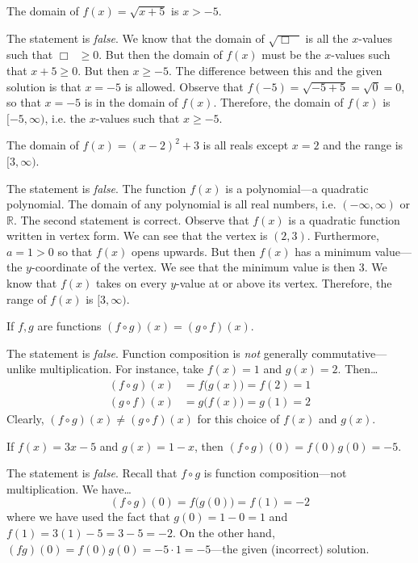 \documentclass[11pt,letterpaper]{article}
\begin{document}
 The domain of $f(x)= \sqrt{x + 5}$ is $x > -5$. \pspace

\sol The statement is \textit{false}. We know that the domain of $\sqrt{\Box{\phantom{x}}\!\!\!}$ is all the $x$-values such that $\Box{\phantom{x}}\!\!\! \geq 0$. But then the domain of $f(x)$ must be the $x$-values such that $x + 5 \geq 0$. But then $x \geq -5$. The difference between this and the given solution is that $x= -5$ is allowed. Observe that $f(-5)= \sqrt{-5 + 5}= \sqrt{0}= 0$, so that $x= -5$ is in the domain of $f(x)$. Therefore, the domain of $f(x)$ is $[-5, \infty)$, i.e. the $x$-values such that $x \geq -5$. \pvspace{{1cm}}



 The domain of $f(x)= (x - 2)^2 + 3$ is all reals except $x= 2$ and the range is $[3, \infty)$. \pspace

\sol The statement is \textit{false}. The function $f(x)$ is a polynomial---a quadratic polynomial. The domain of any polynomial is all real numbers, i.e. $(-\infty, \infty)$ or $\mathbb{R}$. The second statement is correct. Observe that $f(x)$ is a quadratic function written in vertex form. We can see that the vertex is $(2, 3)$. Furthermore, $a= 1 > 0$ so that $f(x)$ opens upwards. But then $f(x)$ has a minimum value---the $y$-coordinate of the vertex. We see that the minimum value is then $3$. We know that $f(x)$ takes on every $y$-value at or above its vertex. Therefore, the range of $f(x)$ is $[3, \infty)$. \pvspace{1cm}



 If $f, g$ are functions $(f \circ g)(x)= (g \circ f)(x)$. \pspace

\sol The statement is \textit{false}. Function composition is \textit{not} generally commutative---unlike multiplication. For instance, take $f(x)= 1$ and $g(x)= 2$. Then\dots
	\[
	\begin{aligned}
	(f \circ g)(x)&= f \big( g(x) \big)= f(2)= 1 \\[0.3cm]
	(g \circ f)(x)&= g \big( f(x) \big)= g(1)= 2
	\end{aligned}
	\]
Clearly, $(f \circ g)(x) \neq (g \circ f)(x)$ for this choice of $f(x)$ and $g(x)$. \pvspace{1.3cm}



 If $f(x)= 3x - 5$ and $g(x) = 1 - x$, then $(f \circ g)(0)= f(0) g(0)= -5$. \pspace

\sol The statement is \textit{false}. Recall that $f \circ g$ is function composition---not multiplication. We have\dots
	\[
	(f \circ g)(0)= f \big( g(0) \big)= f(1)= -2
	\]
where we have used the fact that $g(0)= 1 - 0= 1$ and $f(1)= 3(1) - 5= 3 - 5= -2$. On the other hand, $(fg)(0)= f(0) g(0)= -5 \cdot 1= -5$---the given (incorrect) solution. \pvspace{1.3cm}
\end{document}

